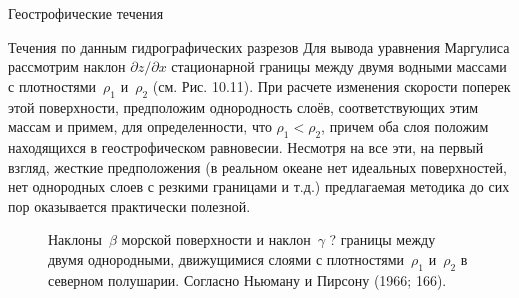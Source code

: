\begin{chapter}{Геострофические течения}
\begin{section}{Течения по данным гидрографических разрезов}
Для вывода уравнения Маргулиса рассмотрим наклон 
$\partial z/\partial x$ стационарной границы между двумя водными
массами с плотностями~$\rho_1$ и~$\rho_2$ (см. Рис. 10.11). При
расчете изменения скорости поперек этой поверхности, предположим
однородность слоёв, соответствующих этим массам и примем, для
определенности, что $\rho_1 < \rho_2$, причем оба слоя положим
находящихся в геострофическом равновесии. Несмотря на все эти, на
первый взгляд, жесткие предположения (в реальном океане нет идеальных
поверхностей, нет однородных слоев с резкими границами и т.д.)
предлагаемая методика до сих пор оказывается практически полезной.
%

\begin{figure}[t!]
\caption{Наклоны~$\beta$ морской поверхности и наклон~$\gamma$ ?
границы между двумя однородными, движущимися слоями с плотностями~$\rho_1$ 
и~$\rho_2$ в северном полушарии. Согласно Ньюману и Пирсону (1966; 166).}
\label{fig:Fig10-10}
\vspace{-3ex}
\end{figure}
%
%


\end{section}
\end{chapter}
